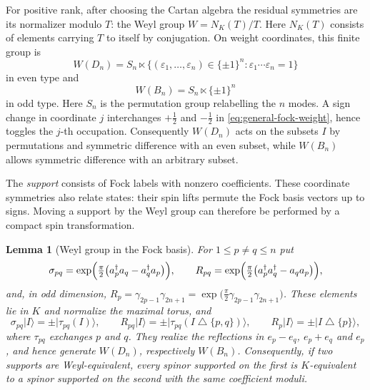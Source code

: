 \documentclass{article}
\newtheorem{lemma}[theorem]{Lemma}
\theoremstyle{definition}
\theoremstyle{remark}
\newcommand{\ket}[1]{\lvert #1\rangle}
\newcommand{\symdiff}{\mathbin{\triangle}}
\begin{document}
For positive rank, after choosing the Cartan algebra the residual symmetries
are its normalizer modulo $T$: the Weyl group $W=N_K(T)/T$. Here $N_K(T)$ consists
of elements carrying $T$ to itself by conjugation. On weight coordinates,
this finite group is
\begin{equation*}
 W(D_n)=S_n\ltimes
 \{(\varepsilon_1,\ldots,\varepsilon_n)\in\{\pm1\}^n:
   \varepsilon_1\cdots\varepsilon_n=1\}
\end{equation*}
in even type and
\begin{equation*}
 W(B_n)=S_n\ltimes\{\pm1\}^n
\end{equation*}
in odd type.  Here $S_n$ is the permutation group relabelling the $n$ modes. A sign change in
coordinate $j$ interchanges $+\frac12$ and $-\frac12$ in
\eqref{eq:general-fock-weight}, hence toggles the $j$-th occupation.
Consequently $W(D_n)$ acts on the subsets $I$ by permutations and
symmetric difference with an even subset, while $W(B_n)$ allows symmetric
difference with an arbitrary subset.

The \emph{support} consists of Fock labels with nonzero coefficients.
These coordinate symmetries also relate states: their spin lifts permute
the Fock basis vectors up to signs. Moving a support by the Weyl group can
therefore be performed by a compact spin transformation.

\begin{lemma}[Weyl group in the Fock basis]
\label{lem:weyl-fock}
For $1\le p\ne q\le n$ put
\begin{equation*}
 \sigma_{pq}=\exp\Bigl(\tfrac\pi2\bigl(a_p^\dagger a_q-a_q^\dagger a_p\bigr)\Bigr),
 \qquad
 R_{pq}=\exp\Bigl(\tfrac\pi2\bigl(a_p^\dagger a_q^\dagger-a_qa_p\bigr)\Bigr),
\end{equation*}
and, in odd dimension, $R_p=\gamma_{2p-1}\gamma_{2n+1}=\exp\bigl(\tfrac\pi2\gamma_{2p-1}\gamma_{2n+1}\bigr)$.
These elements lie in $K$ and normalize the maximal torus, and
\begin{equation*}
 \sigma_{pq}\ket I=\pm\ket{\tau_{pq}(I)},\qquad
 R_{pq}\ket I=\pm\ket{\tau_{pq}(I\symdiff\{p,q\})},\qquad
 R_p\ket I=\pm\ket{I\symdiff\{p\}},
\end{equation*}
where $\tau_{pq}$ exchanges $p$ and $q$. They realize the reflections in
$e_p-e_q$, $e_p+e_q$ and $e_p$, and hence generate $W(D_n)$, respectively
$W(B_n)$. Consequently, if two supports are Weyl-equivalent, every spinor
supported on the first is $K$-equivalent to a spinor supported on the second
with the same coefficient moduli.
\end{lemma}
\end{document}
